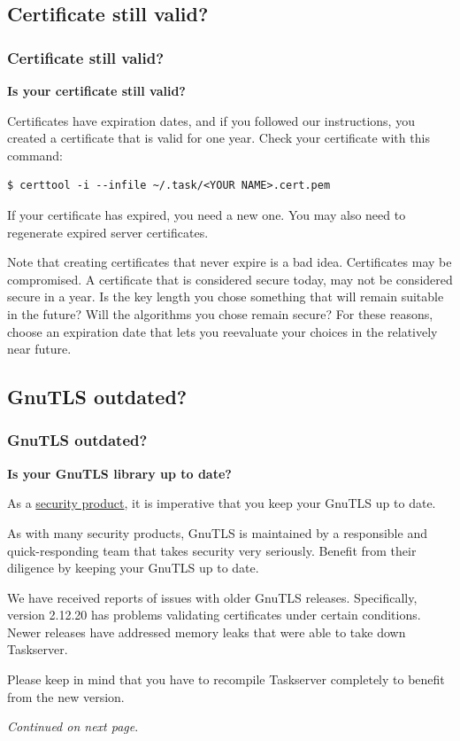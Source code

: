 \documentclass[t,handout]{beamer}
\begin{document}
\subsection{Certificate still valid?}

\begin{frame}[fragile]\frametitle{Certificate still valid?}
    \textbf{Is your certificate still valid?}

    Certificates have expiration dates, and if you followed our instructions, you created a certificate that is valid for one year.  Check your certificate with this command:

    \begin{lstlisting}
$ certtool -i --infile ~/.task/<YOUR NAME>.cert.pem\end{lstlisting}

    If your certificate has expired, you need a new one.  You may also need to regenerate expired server certificates.

    Note that creating certificates that never expire is a bad idea. Certificates may be compromised. A certificate that is considered secure today, may not be considered secure in a year. Is the key length you chose something that will remain suitable in the future? Will the algorithms you          chose remain secure? For these reasons, choose an expiration date that lets you reevaluate your choices in the relatively near future.
\end{frame}

\subsection{GnuTLS outdated?}

\begin{frame}[fragile]\frametitle{GnuTLS outdated?}\label{gnutlsproblem}
    \textbf{Is your GnuTLS library up to date?}

    As a \href{http://gnutls.org/security.html}{security product}, it is imperative that you keep your GnuTLS up to date.

    As with many security products, GnuTLS is maintained by a responsible and quick-responding team that takes security very seriously.  Benefit from their diligence by keeping your GnuTLS up to date.

    We have received reports of issues with older GnuTLS releases. Specifically, version 2.12.20 has problems validating certificates under certain conditions. Newer releases have addressed memory leaks that were able to take down Taskserver.

    Please keep in mind that you have to recompile Taskserver completely to benefit from the new version.

    \emph{Continued on next page}.
\end{frame}
\end{document}
